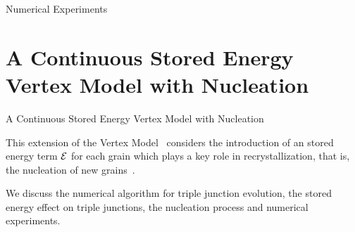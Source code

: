 \documentclass[usenames,dvipsnames]{beamer}
\begin{document}
\begin{frame}{Numerical Experiments}
\begin{minipage}{0.5\textwidth}
\begin{figure}
\end{figure}
\end{minipage}
\end{frame}



\section[Stored Energy Model with Nucleation]{A Continuous Stored Energy Vertex
Model with Nucleation}

\begin{frame}{A Continuous Stored Energy Vertex
Model with Nucleation}

This extension of the Vertex Model~\cite{torres2015} considers the introduction of an stored energy term $\mathcal{E}$ for each grain which plays a key role in recrystallization, that is, the nucleation of new grains~\cite{pikekos2008generalized, pikekos2008stochastic}.

We discuss the numerical algorithm for triple junction evolution, the stored energy effect on triple junctions, the nucleation process and numerical experiments.
\end{frame}
\end{document}
